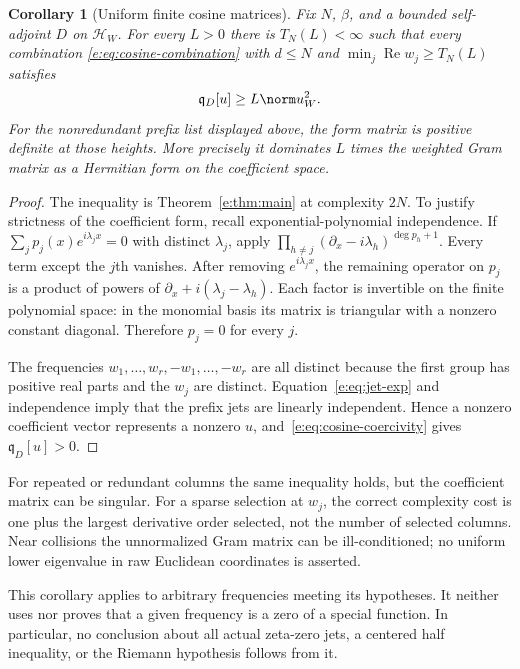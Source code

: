 \documentclass[11pt,a4paper]{article}
\numberwithin{equation}{section}
\newtheorem{corollary}[theorem]{Corollary}
\theoremstyle{definition}\newtheorem{definition}[theorem]{Definition}
\theoremstyle{remark}\newtheorem{remark}[theorem]{Remark}
\newcommand{\HH}{\mathcal H_W}\newcommand{\XX}{X_W}\newcommand{\EE}{\mathcal E_{N,\beta}}
\newcommand{\qD}{\mathfrak q_D}\newcommand{\qth}{\mathfrak q_\theta}
\DeclareMathOperator{\Rea}{Re}\DeclareMathOperator{\Ima}{Im}
\begin{document}
\begin{corollary}[Uniform finite cosine matrices]\label{e:cor:cosine}
Fix $N$, $\beta$, and a bounded self-adjoint $D$ on $\HH$. For every
$L>0$ there is $T_N(L)<\infty$ such that every combination
\eqref{e:eq:cosine-combination} with $d\le N$ and
$\min_j\Rea w_j\ge T_N(L)$ satisfies
\begin{equation}\label{e:eq:cosine-coercivity}
 \qD[u]\ge L\norm u_W^2.
\end{equation}
For the nonredundant prefix list displayed above, the form matrix is
positive definite at those heights. More precisely it dominates $L$ times
the weighted Gram matrix as a Hermitian form on the coefficient space.
\end{corollary}
\begin{proof}
The inequality is Theorem~\ref{e:thm:main} at complexity $2N$. To justify
strictness of the coefficient form, recall exponential-polynomial
independence. If $\sum_jp_j(x)e^{i\lambda_jx}=0$ with distinct
$\lambda_j$, apply
$\prod_{h\ne j}(\partial_x-i\lambda_h)^{\deg p_h+1}$.
Every term except the $j$th vanishes. After removing $e^{i\lambda_jx}$,
the remaining operator on $p_j$ is a product of powers of
$\partial_x+i(\lambda_j-\lambda_h)$.
Each factor is invertible on the finite polynomial space: in the monomial
basis its matrix is triangular with a nonzero constant diagonal.
Therefore $p_j=0$ for every $j$.

The frequencies $w_1,\ldots,w_r,-w_1,\ldots,-w_r$ are all distinct
because the first group has positive real parts and the $w_j$ are distinct.
Equation~\eqref{e:eq:jet-exp} and independence imply that the prefix jets
are linearly independent. Hence a nonzero coefficient vector represents a
nonzero $u$, and~\eqref{e:eq:cosine-coercivity} gives $\qD[u]>0$.
\end{proof}

For repeated or redundant columns the same inequality holds, but the
coefficient matrix can be singular. For a sparse selection at $w_j$, the
correct complexity cost is one plus the largest derivative order selected,
not the number of selected columns. Near collisions the unnormalized Gram
matrix can be ill-conditioned; no uniform lower eigenvalue in raw
Euclidean coordinates is asserted.

This corollary applies to arbitrary frequencies meeting its hypotheses.
It neither uses nor proves that a given frequency is a zero of a special
function. In particular, no conclusion about all actual zeta-zero jets,
a centered half inequality, or the Riemann hypothesis follows from it.
\end{document}
